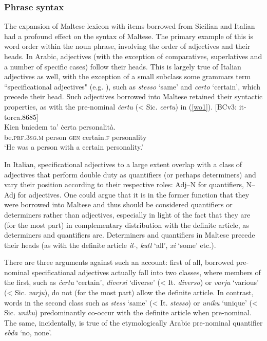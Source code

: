 \documentclass[output=paper]{langsci/langscibook}
\begin{document}
\subsubsection{Phrase syntax}
 \label{wo} %
The expansion of Maltese lexicon with items borrowed from Sicilian and Italian had a profound effect on the syntax of Maltese. The primary example of this is word order within the noun phrase, involving the order of adjectives and their heads. In Arabic, adjectives (with the exception of comparatives, superlatives and a number of specific cases) follow their heads. This is largely true of Italian adjectives as well, with the exception of a small subclass some grammars term ``specificational adjectives" (e.g. \citealt[55--56]{italian2007}), such as \textit{stesso} `same' and \textit{certo} `certain', which precede their head. Such adjectives borrowed into Maltese retained their syntactic properties, as with the pre-nominal \textit{ċertu} (< Sic. \textit{certu}) in (\ref{wo1}).
\ea\label{wo1} 
{[BCv3: it-torca.8685]} \\
	\gll Kien bniedem ta' ċerta personalità. \\
	be.\textsc{prf.3sg.m} person \textsc{gen} certain.\textsc{f} personality\\
	\glt `He was a person with a certain personality.'\\
\z

In Italian, specificational adjectives to a large extent overlap with a class of adjectives that perform double duty as quantifiers (or perhaps determiners) and vary their position according to their respective roles: Adj--N for quantifiers, N--Adj for adjectives. One could argue that it is in the former function that they were borrowed into Maltese and thus should be considered quantifiers or determiners rather than adjectives, especially in light of the fact that they are (for the most part) in complementary distribution with the definite article, as determiners and quantifiers are. Determiners and quantifiers in Maltese precede their heads (as with the definite article \textit{il-}, \textit{kull} `all', \textit{xi} `some' etc.).

There are three arguments against such an account: first of all, borrowed pre-nominal specificational adjectives actually fall into two classes, where members of the first, such as \textit{ċertu} `certain', \textit{diversi} `diverse' (< It. \textit{diverso}) or \textit{varju} `various' (< Sic. \textit{varju}), do not (for the most part) allow the definite article. In contrast, words in the second class such as \textit{stess} `same' (< It. \textit{stesso}) or \textit{uniku} `unique' (< Sic. \textit{uniku}) predominantly co-occur with the definite article when pre-nominal. The same, incidentally, is true of the etymologically Arabic pre-nominal quantifier \textit{ebda} `no, none'.
\end{document}
